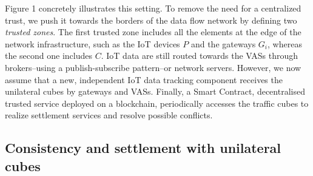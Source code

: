 \documentclass[chi_draft]{sigchi}
\begin{document}
Figure 1 concretely illustrates this setting. To remove the need for a centralized trust, we push it towards the borders of the data flow network by defining two \textit{trusted zones}.
The first trusted zone includes all the elements at the edge of the network infrastructure, such as the IoT devices $P$ and the gateways $ G_i $, whereas the second one includes $ C $.
IoT data are still routed towards the VASs through brokers--using a publish-subscribe pattern--or network servers.
However, we now assume that a new, independent IoT data tracking component receives the unilateral cubes by gateways and VASs.
Finally, a Smart Contract, decentralised trusted service deployed on a blockchain, periodically accesses the traffic cubes to realize settlement services and resolve possible conflicts.

\subsection{Consistency and settlement with unilateral cubes}
\end{document}
